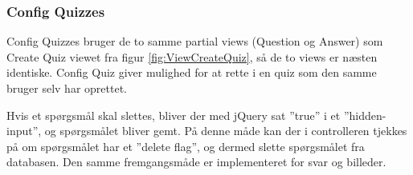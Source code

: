 \subsubsection{Config Quizzes}

Config Quizzes bruger de to samme partial views (Question og Answer) som Create Quiz viewet fra figur \ref{fig:ViewCreateQuiz}, så de to views er næsten identiske. Config Quiz giver mulighed for at rette i en quiz som den samme bruger selv har oprettet.

Hvis et spørgsmål skal slettes, bliver der med jQuery sat ''true'' i et ''hidden-input'', og spørgsmålet bliver gemt. På denne måde kan der i controlleren tjekkes på om spørgsmålet har et ''delete flag'', og dermed slette spørgsmålet fra databasen.
Den samme fremgangsmåde er implementeret for svar og billeder.